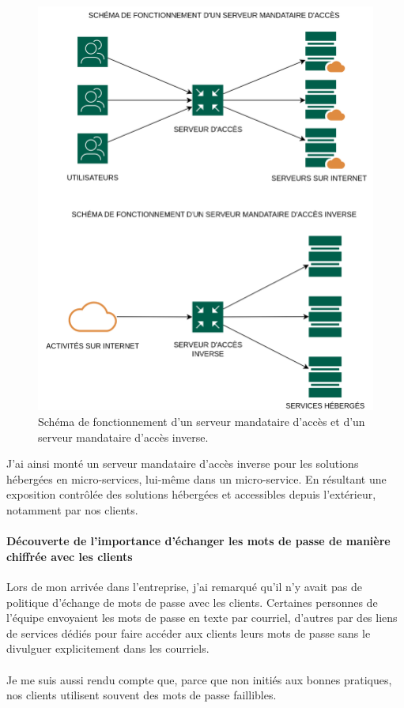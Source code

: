 \begin{figure}[H] %
  \centering
  \captionsetup{justification=centering}
  \includegraphics[scale = 0.2]{images/diagrammes/reverse-proxy/serveur_mandataire_acces.png}
  \caption{Schéma de fonctionnement d'un serveur mandataire d'accès et d'un serveur mandataire d'accès inverse.}  
  \label{fig:serveur_mandataire_acces} %
\end{figure}

\noindent J'ai ainsi monté un serveur mandataire d'accès inverse pour les solutions hébergées en micro-services, lui-même dans un micro-service. En résultant une exposition contrôlée des solutions hébergées et accessibles depuis l'extérieur, notamment par nos clients.

\paragraph{Découverte de l'importance d'échanger les mots de passe de manière chiffrée avec les clients}

Lors de mon arrivée dans l'entreprise, j'ai remarqué qu'il n'y avait pas de politique d'échange de mots de passe avec les clients. Certaines personnes de l'équipe envoyaient les mots de passe en texte par courriel, d'autres par des liens de services dédiés pour faire accéder aux clients leurs mots de passe sans le divulguer explicitement dans les courriels.
\\ \\
Je me suis aussi rendu compte que, parce que non initiés aux bonnes pratiques, nos clients utilisent souvent des mots de passe faillibles.

